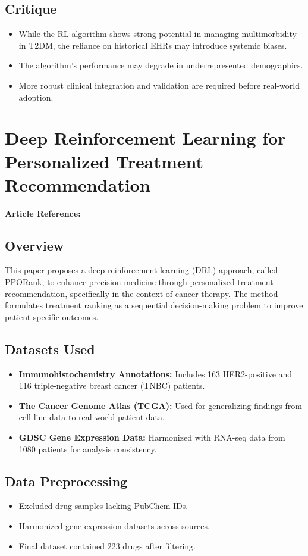 \subsection*{Critique}
\begin{itemize}
    \item While the RL algorithm shows strong potential in managing multimorbidity in T2DM, the reliance on historical EHRs may introduce systemic biases.
    \item The algorithm's performance may degrade in underrepresented demographics.
    \item More robust clinical integration and validation are required before real-world adoption.
\end{itemize}

\section{Deep Reinforcement Learning for Personalized Treatment Recommendation}
\textbf{Article Reference:} \cite{article_19}

\subsection*{Overview}
This paper proposes a deep reinforcement learning (DRL) approach, called PPORank, to enhance precision medicine through personalized treatment recommendation, specifically in the context of cancer therapy. The method formulates treatment ranking as a sequential decision-making problem to improve patient-specific outcomes.

\subsection*{Datasets Used}
\begin{itemize}
    \item \textbf{Immunohistochemistry Annotations:} Includes 163 HER2-positive and 116 triple-negative breast cancer (TNBC) patients.
    \item \textbf{The Cancer Genome Atlas (TCGA):} Used for generalizing findings from cell line data to real-world patient data.
    \item \textbf{GDSC Gene Expression Data:} Harmonized with RNA-seq data from 1080 patients for analysis consistency.
\end{itemize}

\subsection*{Data Preprocessing}
\begin{itemize}
    \item Excluded drug samples lacking PubChem IDs.
    \item Harmonized gene expression datasets across sources.
    \item Final dataset contained 223 drugs after filtering.
\end{itemize}

